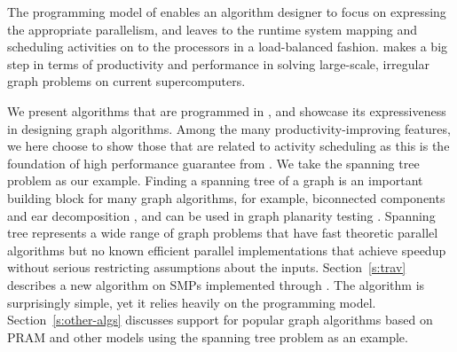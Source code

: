 
The programming model of \Xten{} enables an algorithm designer to
focus on expressing the appropriate parallelism, and leaves to the
runtime system mapping and scheduling activities on to the processors
in a load-balanced fashion. \Xten{} makes a big step in terms of
productivity and performance in solving large-scale, irregular graph
problems on current supercomputers.


We present algorithms that are programmed in \Xten{}, and showcase
its expressiveness in designing graph algorithms. Among the many
productivity-improving features, we here choose to show those that are
related to activity scheduling as this is the foundation of high
performance guarantee from \Xten{}.  
We take the spanning tree problem
as our example. Finding a spanning tree of a graph is an important
building block for many graph algorithms, for example, biconnected
components and ear decomposition \cite{MR86}, and can be used in graph
planarity testing \cite{KR88}.  Spanning tree represents a wide range
of graph problems that have fast theoretic parallel algorithms but no
known efficient parallel implementations that achieve speedup without
serious restricting assumptions about the inputs.
Section~\ref{s:trav} describes a new algorithm on SMPs implemented
through \Xten{}. The algorithm is surprisingly simple, yet it relies
heavily on the \Xten{} programming model. Section~\ref{s:other-algs}
discusses \Xten{} support for popular graph algorithms based on PRAM
and other models using the spanning tree problem as an example.

 

